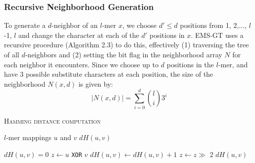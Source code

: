 \documentclass[oneside,12pt]{DISCSthesis}
\begin{document}
{		\subsubsection{Recursive Neighborhood Generation}
			To generate a $d$-neighbor of an $l$-mer $x$, we choose $d' \leq d$ positions from 1, 2,..., $l$-1, $l$ and change the character at each of the $d'$ positions in $x$. EMS-GT uses a recursive procedure (Algorithm 2.3) to do this, effectively (1) traversing the tree of all $d$-neighbors and (2) setting the bit flag in the neighborhood array $N$ for each neighbor it encounters. Since we choose up to $d$ positions in the $l$-mer, and have 3 possible substitute characters at each position, the size of the neighborhood $N(x,d)$ is given by: %
			\begin{equation}
				\left|N(x,d)\right| = \sum_{i=0}^d \binom{l}{i} 3^{i}
			\end{equation}

		\newpage
		{
			\noindent \hspace*{6pt}{\bf Algorithm 2.2} \textsc{Hamming distance computation}\small
			\begin{algorithmic}[1]\label{alg:hamming-distance-comp}
				\Require $l$-mer mappings $u$ and $v$
				\Ensure $dH(u,v)$\vspace*{6pt}

				\State $dH(u,v) = 0$
				\State $z \leftarrow u$ \texttt{XOR} $v$
				\State $dH(u,v) \leftarrow dH(u,v) + 1$
				\EndIf
				\State $z \leftarrow z \gg$ 2 			\hspace{150pt}
				\EndFor
				\State\Return $dH(u,v)$
				\end{algorithmic}
			}

			\bigskip\bigskip\bigskip

}
\end{document}
